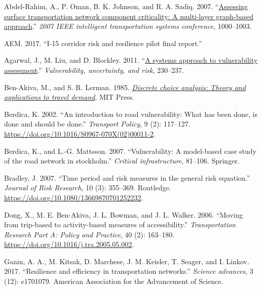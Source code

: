 \documentclass[]{ascelike-new}
\newlength{\cslhangindent}
\newlength{\cslentryspacingunit} %
\newenvironment{CSLReferences}[2] %
 {%
  \setlength{\parindent}{0pt}
  \ifodd #1
  \let\oldpar\par
  \def\par{\hangindent=\cslhangindent\oldpar}
  \fi
  \setlength{\parskip}{#2\cslentryspacingunit}
 }%
 {}
\begin{document}
\hypertarget{refs}{}
\begin{CSLReferences}{1}{0}
\leavevmode{}%
Abdel-Rahim, A., P. Oman, B. K. Johnson, and R. A. Sadiq. 2007.
{``\href{https://doi.org/10.1109/ITSC.2007.4357801}{Assessing surface
transportation network component criticality: A multi-layer graph-based
approach}.''} \emph{2007 IEEE intelligent transportation systems
conference}, 1000--1003.

\leavevmode{}%
AEM. 2017. {``I-15 corridor risk and resilience pilot final report.''}

\leavevmode{}%
Agarwal, J., M. Liu, and D. Blockley. 2011.
{``\href{https://doi.org/10.1061/41170(400)28}{A systems approach to
vulnerability assessment}.''} \emph{Vulnerability, uncertainty, and
risk}, 230--237.

\leavevmode{}%
Ben-Akiva, M., and S. R. Lerman. 1985.
\emph{\href{https://www.jstor.org/stable/1391567?origin=crossref}{Discrete
choice analysis: Theory and applications to travel demand}}. MIT Press.

\leavevmode{}%
Berdica, K. 2002. {``An introduction to road vulnerability: What has
been done, is done and should be done.''} \emph{Transport Policy}, 9
(2): 117--127. \url{https://doi.org/10.1016/S0967-070X(02)00011-2}.

\leavevmode{}%
Berdica, K., and L.-G. Mattsson. 2007. {``Vulnerability: A model-based
case study of the road network in stockholm.''} \emph{Critical
infrastructure}, 81--106. Springer.

\leavevmode{}%
Bradley, J. 2007. {``Time period and risk measures in the general risk
equation.''} \emph{Journal of Risk Research}, 10 (3): 355--369.
Routledge. \url{https://doi.org/10.1080/13669870701252232}.

\leavevmode{}%
Dong, X., M. E. Ben-Akiva, J. L. Bowman, and J. L. Walker. 2006.
{``Moving from trip-based to activity-based measures of
accessibility.''} \emph{Transportation Research Part A: Policy and
Practice}, 40 (2): 163--180.
\url{https://doi.org/10.1016/j.tra.2005.05.002}.

\leavevmode{}%
Ganin, A. A., M. Kitsak, D. Marchese, J. M. Keisler, T. Seager, and I.
Linkov. 2017. {``Resilience and efficiency in transportation
networks.''} \emph{Science advances}, 3 (12): e1701079. American
Association for the Advancement of Science.


\end{CSLReferences}
\end{document}
